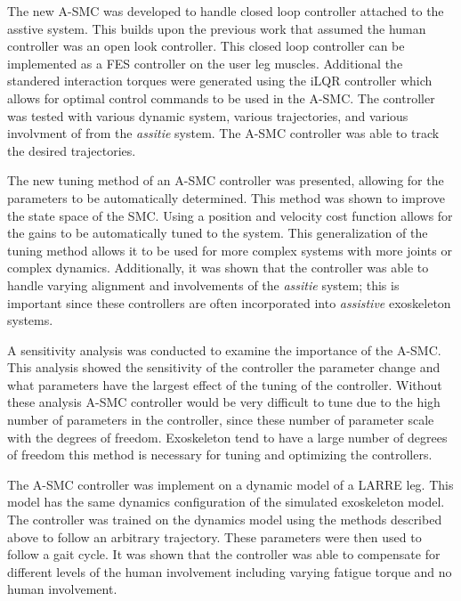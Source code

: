 The new A-SMC was developed to handle closed loop controller attached to the asstive system. This builds upon the previous work that assumed the human controller was an open look controller. This closed loop controller can be implemented as a FES controller on the user leg muscles. Additional the standered interaction torques were generated using the iLQR controller which allows for optimal control commands to be used in the A-SMC. The controller was tested with various dynamic system, various trajectories, and various involvment of from the  \textit{assitie} system. The A-SMC controller was able to track the desired trajectories. 

The new tuning method of an A-SMC controller was presented, allowing for the parameters to be automatically determined. This method was shown to improve the state space of the SMC. Using a position and velocity cost function allows for the gains to be automatically tuned to the system. This generalization of the tuning method allows it to be used for more complex systems with more joints or complex dynamics.  Additionally, it was shown that the controller was able to handle varying alignment and involvements of the \textit{assitie} system; this is important since these controllers are often incorporated into \textit{assistive} exoskeleton systems. 

A sensitivity analysis was conducted to examine the importance of the A-SMC. This analysis showed the sensitivity of the controller the parameter change and what parameters have the largest effect of the tuning of the controller. Without these analysis A-SMC controller would be very difficult to tune due to the high number of parameters in the controller, since these number of parameter scale with the degrees of freedom. Exoskeleton tend to have a large number of degrees of freedom this method is necessary for tuning and optimizing the controllers.   

The A-SMC controller was implement on a dynamic model of a LARRE leg. This model has the same dynamics configuration of the simulated exoskeleton model. The controller was trained on the dynamics model using the methods described above to follow an arbitrary trajectory. These parameters were then used to follow a gait cycle. It was shown that the controller was able to compensate for different levels of the human involvement including varying fatigue torque and no human involvement.   





